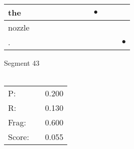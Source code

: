 \documentclass[landscape]{article}
\newcommand{\ssp}{\hspace{2pt}}
\newcommand{\mex}{\cellcolor{g}$\bullet$}
\begin{document}
\begin{tabular}{|l|p{10pt}|p{10pt}|p{10pt}|p{10pt}|p{10pt}|p{10pt}|p{10pt}|p{10pt}|p{10pt}|p{10pt}|p{10pt}|}
\hline
\ssp \cellcolor{ref7}the \ssp&\hspace{2pt}&\hspace{2pt}&\hspace{2pt}&\hspace{2pt}&\hspace{2pt}&\hspace{2pt}&\hspace{2pt}&\hspace{2pt}\mex&\hspace{2pt}&\hspace{2pt}&\hspace{2pt}\\
\hline
\ssp nozzle \ssp&\hspace{2pt}&\hspace{2pt}&\hspace{2pt}&\hspace{2pt}&\hspace{2pt}&\hspace{2pt}&\hspace{2pt}&\hspace{2pt}&\hspace{2pt}&\hspace{2pt}&\hspace{2pt}\\
\hline
\ssp \cellcolor{ref10}. \ssp&\hspace{2pt}&\hspace{2pt}&\hspace{2pt}&\hspace{2pt}&\hspace{2pt}&\hspace{2pt}&\hspace{2pt}&\hspace{2pt}&\hspace{2pt}&\hspace{2pt}&\hspace{2pt}\mex\\
\hline
\end{tabular}

\vspace{6pt}
\noindent Segment 43\\\\
\noindent\begin{tabular}{lm{12pt}r}
\hline
P:&&0.200\\
R:&&0.130\\
Frag:&&0.600\\
Score:&&0.055\\
\end{tabular}
\end{document}
